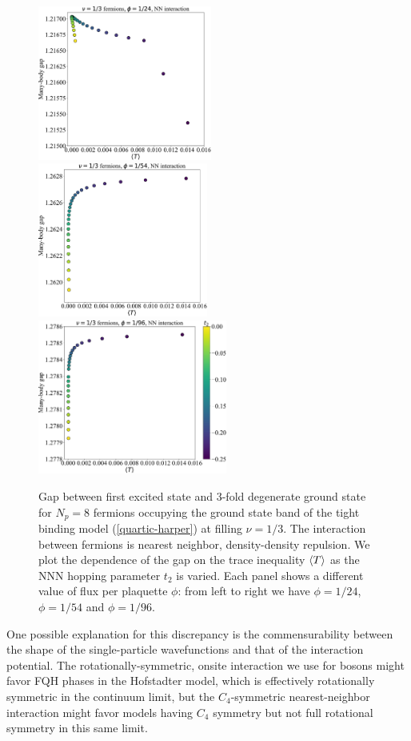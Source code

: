 \documentclass[aps,prb,twocolumn,letterpaper,twoside,nobalancelastpage,groupedaddress,amsmath,amssymb,floatfix,citeautoscript]{revtex4-1}
\begin{document}
\begin{figure}[t]
\includegraphics[width=2.25in]{gap-v-trace-fermions-24-NN.pdf}
\includegraphics[width=2.2in]{gap-v-trace-fermions-54-NN.pdf}
\includegraphics[width=2.45in]{gap-v-trace-fermions-96-NN.pdf}
\caption{\label{gap-v-trace-fermions-NN} Gap between first excited state and 3-fold degenerate ground state for $N_p = 8$ fermions occupying the ground state band of the tight binding model (\ref{quartic-harper}) at filling $\nu=1/3$. The interaction between fermions is nearest neighbor, density-density repulsion. We plot the dependence of the gap on the trace inequality $\expval{T}$ as the NNN hopping parameter $t_2$ is varied. Each panel shows a different value of flux per plaquette $\phi$: from left to right we have $\phi=1/24$, $\phi=1/54$ and $\phi=1/96$.}
\end{figure}

One possible explanation for this discrepancy is the commensurability between the shape of the single-particle wavefunctions and that of the interaction potential. The rotationally-symmetric, onsite interaction we use for bosons might favor FQH phases in the Hofstadter model, which is effectively rotationally symmetric in the continuum limit, but the $C_4$-symmetric nearest-neighbor interaction might favor models having $C_4$ symmetry but not full rotational symmetry in this same limit.
\end{document}
